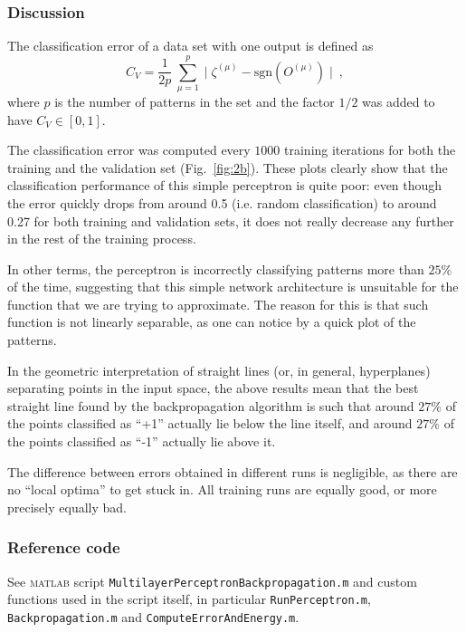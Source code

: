 \documentclass[12pt,titlepage]{article}
\begin{document}
\vspace*{-0.2cm}
\subsubsection*{Discussion}
\vspace*{-0.3cm}
The classification error of a data set with one output is defined as
\vspace*{-0.1cm}
\begin{equation}
C_V = \dfrac{1}{2p} \ \sum_{\mu = 1}^p \mid \zeta^{(\mu)} - \text{sgn}(O^{(\mu)}) \mid \ , 
\end{equation}%
where $p$ is the number of patterns in the set and the factor $1/2$ was added to have $C_V \in [0,1]$.

The classification error was computed every $1000$ training iterations for both the training and the validation set (Fig.~\ref{fig:2b}). These plots clearly show that the classification performance of this simple perceptron is quite poor: even though the error quickly drops from around 0.5 (i.e. random classification) to around 0.27 for both training and validation sets, it does not really decrease any further in the rest of the training process.

In other terms, the perceptron is incorrectly classifying patterns more than $25\%$ of the time, suggesting that this simple network architecture is unsuitable for the function that we are trying to approximate. The reason for this is that such function is not linearly separable, as one can notice by a quick plot of the patterns.

In the geometric interpretation of straight lines (or, in general, hyperplanes) separating points in the input space, the above results mean that the best straight line found by the backpropagation algorithm 
is such that around $27\%$ of the points classified as ``+1'' actually lie below the line itself, and around $27\%$ of the points classified as ``-1'' actually lie above it.

The difference between errors obtained in different runs is negligible, as there are no ``local optima'' to get stuck in. All training runs are equally good, or more precisely equally bad.

\vspace*{-0.2cm}
\subsubsection*{Reference code}
\vspace*{-0.2cm}
See \textsc{matlab} script \verb!MultilayerPerceptronBackpropagation.m! and custom functions used in the script itself, in particular \verb!RunPerceptron.m!, \verb!Backpropagation.m! and \verb!ComputeErrorAndEnergy.m!.
\end{document}

